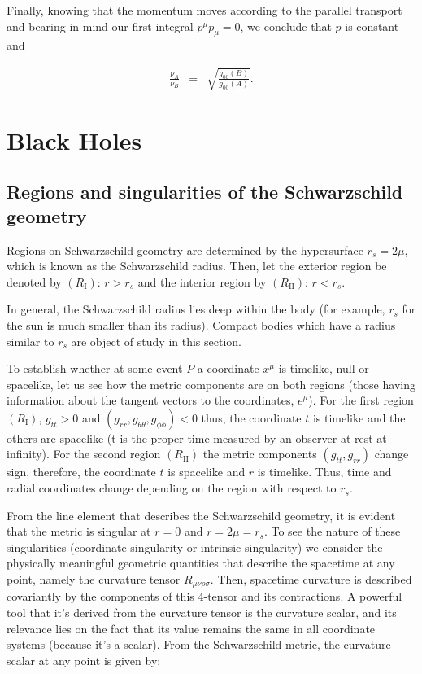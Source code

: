 \documentclass[letterpaper,11pt,onecolumn]{article}
\begin{document}
Finally, knowing that the momentum moves according to the parallel transport and bearing in mind our first integral $p^{\mu}p_{\mu} = 0$, we conclude that $p$ is constant and 

        \begin{eqnarray*}
         \frac{\nu_{A}}{\nu_{B}} &=&  \sqrt{\frac{g_{00}(B)}{g_{00}(A)}}.
    \end{eqnarray*}



\section{Black Holes}\label{bh}

\subsection{Regions and singularities of the Schwarzschild geometry}

Regions on Schwarzschild geometry are determined by the hypersurface $r_s=2\mu$, which is known as the Schwarzschild radius. Then, let the exterior region be denoted by $(R_{\mathrm{I}})$: $r>r_s$ and the interior region by $(R_{\mathrm{II}})$: $r<r_s$.

In general, the Schwarzschild radius lies deep within the body (for example, $r_s$ for the sun is much smaller than its radius). Compact bodies which have a radius similar to $r_s$ are object of study in this section.

To establish whether at some event $P$ a coordinate $x^\mu$ is timelike, null or spacelike, let us see how the metric components are on both regions (those having information about the tangent vectors to the coordinates, $e^\mu$). For the first region $(R_{\mathrm{I}})$, $g_{tt}>0$ and $(g_{rr}, g_{\theta \theta}, g_{\phi \phi})<0$  thus, the coordinate $t$ is timelike and the others are spacelike (t is the proper time measured by an observer at rest at infinity).  For the second region $(R_{\mathrm{II}})$ the metric components $(g_{tt}, g_{rr})$ change sign, therefore, the coordinate $t$ is spacelike and $r$ is timelike. Thus, time and radial coordinates change depending on the region with respect to $r_s$.

From the line element that describes the Schwarzschild geometry, it is evident that the metric is singular at $r=0$ and $r=2\mu=r_s$. To see the nature of these singularities (coordinate singularity or intrinsic singularity) we consider the physically meaningful geometric quantities that describe the spacetime at any point, namely the curvature tensor $R_{\mu\nu\rho\sigma}$. Then, spacetime curvature
is described covariantly by the components of this 4-tensor and its contractions. A powerful tool that it's derived from the curvature tensor is the curvature scalar, and its relevance lies on the fact that its value remains the same in all coordinate systems (because it's a scalar). From the Schwarzschild metric, the curvature scalar at any point is given by:
\end{document}
